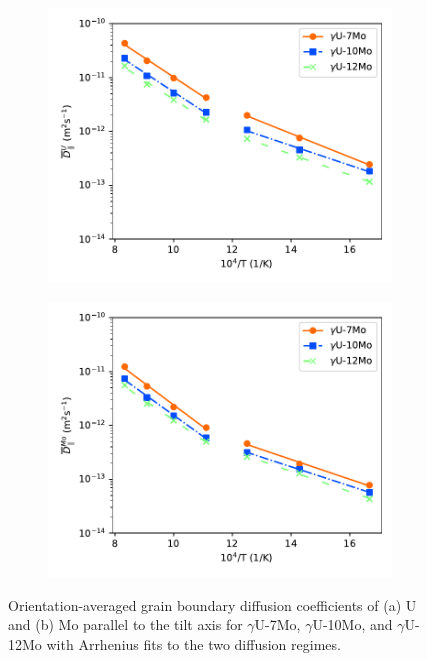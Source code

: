 \documentclass{elsarticle}
\begin{document}
\begin{figure}[!ht]
\begin{subfigure}{0.49\textwidth}
	\centering
	\caption{}
	\includegraphics[width=\textwidth]{2reg_U_Dz.pdf}
\end{subfigure}
\begin{subfigure}{0.49\textwidth}
	\centering
	\caption{}
	\includegraphics[width=\textwidth]{2reg_Mo_Dz.pdf}
\end{subfigure}
\caption{Orientation-averaged grain boundary diffusion coefficients of (a) U and (b) Mo parallel to the tilt axis for $\gamma$U-7Mo, $\gamma$U-10Mo, and $\gamma$U-12Mo with Arrhenius fits to the two diffusion regimes.}
\label{fig:2reg}
\end{figure}
\end{document}
